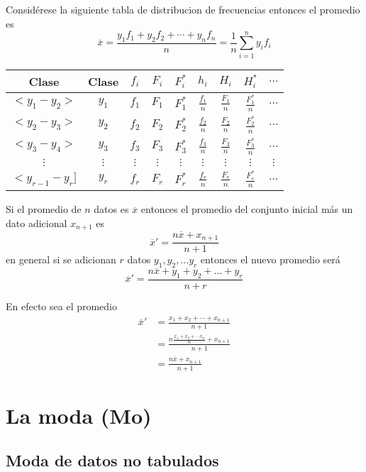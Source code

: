 \documentclass[10pt,]{krantz}
\theoremstyle{definition}
\theoremstyle{definition}
\theoremstyle{definition}
\theoremstyle{remark}
\let\BeginKnitrBlock\begin \let\EndKnitrBlock\end
\begin{document}
Considérese la siguiente tabla de distribucion de frecuencias entonces el promedio es \[\overline{x}=\frac{y_1f_1+y_2f_2+\cdots+y_nf_n}{n}=\frac{1}{n}\sum_{i=1}^ny_if_i\]

\begin{longtable}[]{@{}ccccccccc@{}}
\toprule
Clase & Clase & \(f_i\) & \(F_i\) & \(F_i^*\) & \(h_i\) & \(H_i\) & \(H_i^*\) & \(\ldots\)\tabularnewline
\midrule
\endhead
\(<y_1-y_2>\) & \(y_1\) & \(f_1\) & \(F_1\) & \(F_1^*\) & \(\frac{f_1}{n}\) & \(\frac{F_1}{n}\) & \(\frac{F_1^*}{n}\) & \(\ldots\)\tabularnewline
\(<y_2-y_3>\) & \(y_2\) & \(f_2\) & \(F_2\) & \(F_2^*\) & \(\frac{f_2}{n}\) & \(\frac{F_2}{n}\) & \(\frac{F_2^*}{n}\) & \(\ldots\)\tabularnewline
\(<y_3-y_4>\) & \(y_3\) & \(f_3\) & \(F_3\) & \(F_3^*\) & \(\frac{f_3}{n}\) & \(\frac{F_3}{n}\) & \(\frac{F_3^*}{n}\) & \(\ldots\)\tabularnewline
\(\vdots\) & \(\vdots\) & \(\vdots\) & \(\vdots\) & \(\vdots\) & \(\vdots\) & \(\vdots\) & \(\vdots\) & \(\vdots\)\tabularnewline
\(<y_{r-1}-y_r]\) & \(y_r\) & \(f_r\) & \(F_r\) & \(F_r^*\) & \(\frac{f_r}{n}\) & \(\frac{F_r}{n}\) & \(\frac{F_r^*}{n}\) & \(...\)\tabularnewline
\bottomrule
\end{longtable}

\BeginKnitrBlock{exercise}
\protect\hypertarget{exr:unnamed-chunk-3}{}{\label{exr:unnamed-chunk-3} }Si el promedio de \(n\) datos es \(\overline{x}\) entonces el promedio del conjunto inicial más un dato adicional \(x_{n+1}\) es \[\overline{x}'=\frac{n\overline{x}+x_{n+1}}{n+1}\] en general si se adicionan \(r\) datos \(y_1, y_2, \ldots y_r\) entonces el nuevo promedio será \[\overline{x}'=\frac{n\overline{x}+y_{1}+y_2+\ldots+y_r}{n+r}\]
\EndKnitrBlock{exercise}

\BeginKnitrBlock{solution}
\iffalse{} {Solución. } \fi{}En efecto sea el promedio
\begin{align*}
\overline{x}'&=\frac{x_1+x_2+\cdots+x_{n+1}}{n+1}\\
&=\frac{n\frac{x_1+x_2+\cdots x_n}{n}+x_{n+1}}{n+1}\\
&=\frac{n\overline{x}+x_{n+1}}{n+1}
\end{align*}
\EndKnitrBlock{solution}

\hypertarget{la-moda-mo}{%
\section{La moda (Mo)}\label{la-moda-mo}}

\hypertarget{moda-de-datos-no-tabulados}{%
\subsection{Moda de datos no tabulados}\label{moda-de-datos-no-tabulados}}
\end{document}
